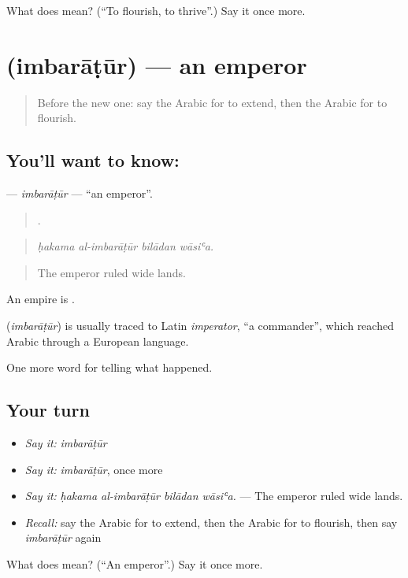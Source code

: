 \begin{tcolorbox}[breakable,colback=teal!4,colframe=teal!35!black,title={Before you move on}]
What does  mean? (\textquotedblleft{}To flourish, to thrive\textquotedblright{}.) Say it once more.
\end{tcolorbox}
\section[\texorpdfstring{\ar{إمبراطور} (imbarāṭūr)}{إمبراطور (imbarāṭūr)}]{ (imbarāṭūr) — an emperor}

\label{lesson:AR-C331-imbaratur}



\begin{quote}
Before the new one: say the Arabic for to extend, then the Arabic for to flourish.
\end{quote}

\subsection*{You'll want to know: }
\textbf{} — \emph{imbarāṭūr} — \textquotedblleft{}an emperor\textquotedblright{}.

\begin{quote}
   .
\end{quote}

\begin{quote}
\emph{ḥakama al-imbarāṭūr bilādan wāsiʿa.}
\end{quote}

\begin{quote}
The emperor ruled wide lands.
\end{quote}

An empire is .

\begin{cousinweb}
\textbf{} (\emph{imbarāṭūr}) is usually traced to Latin \emph{imperator}, \textquotedblleft{}a commander\textquotedblright{}, which reached Arabic through a European language.
\end{cousinweb}

\begin{grammarlens}[title={What you've built}]
One more word for telling what happened.
\end{grammarlens}

\subsection*{Your turn}
\begin{itemize}
\raggedright
  \item \emph{Say it:} \emph{imbarāṭūr}
  \item \emph{Say it:} \emph{imbarāṭūr}, once more
  \item \emph{Say it:} \emph{ḥakama al-imbarāṭūr bilādan wāsiʿa.} — The emperor ruled wide lands.
  \item \emph{Recall:} say the Arabic for to extend, then the Arabic for to flourish, then say \emph{imbarāṭūr} again
\end{itemize}

\begin{tcolorbox}[breakable,colback=teal!4,colframe=teal!35!black,title={Before you move on}]
What does  mean? (\textquotedblleft{}An emperor\textquotedblright{}.) Say it once more.
\end{tcolorbox}

